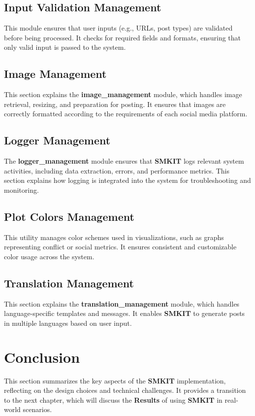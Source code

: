 \subsection{Input Validation Management}
\label{subsec:input_validation_management}
This module ensures that user inputs (e.g., URLs, post types) are validated before being processed. It checks for required fields and formats, ensuring that only valid input is passed to the system.

\subsection{Image Management}
\label{subsec:image_management}
This section explains the \textbf{image\_management} module, which handles image retrieval, resizing, and preparation for posting. It ensures that images are correctly formatted according to the requirements of each social media platform.

\subsection{Logger Management}
\label{subsec:logger_management}
The \textbf{logger\_management} module ensures that \textbf{SMKIT} logs relevant system activities, including data extraction, errors, and performance metrics. This section explains how logging is integrated into the system for troubleshooting and monitoring.

\subsection{Plot Colors Management}
\label{subsec:plot_colors_management}
This utility manages color schemes used in visualizations, such as graphs representing conflict or social metrics. It ensures consistent and customizable color usage across the system.

\subsection{Translation Management}
\label{subsec:translation_management}
This section explains the \textbf{translation\_management} module, which handles language-specific templates and messages. It enables \textbf{SMKIT} to generate posts in multiple languages based on user input.

\section{Conclusion}
\label{sec:implementation_conclusion}
This section summarizes the key aspects of the \textbf{SMKIT} implementation, reflecting on the design choices and technical challenges. It provides a transition to the next chapter, which will discuss the \textbf{Results} of using \textbf{SMKIT} in real-world scenarios.
